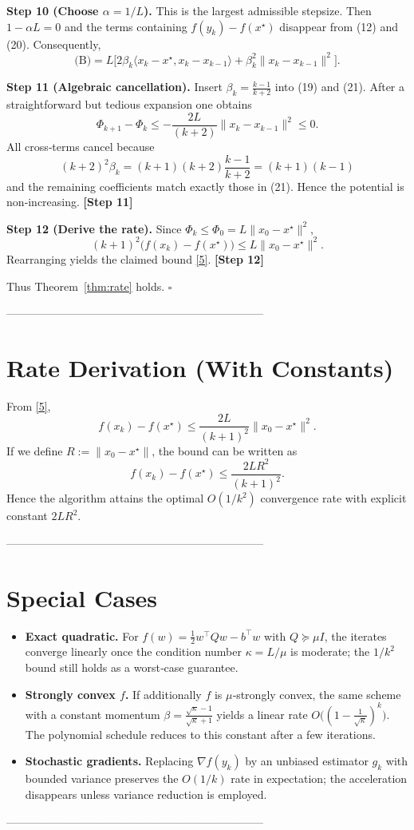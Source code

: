 \documentclass{article}
\newcommand{\grad}{\nabla}
\begin{document}
\noindent\textbf{Step 10 (Choose $\alpha=1/L$).} This is the largest admissible stepsize. Then $1-\alpha L=0$ and the terms containing $f(y_k)-f(x^\star)$ disappear from (12) and (20). Consequently,
\[
\text{(B)} = L\bigl[2\beta_k\langle x_k-x^\star,x_k-x_{k-1}\rangle
+\beta_k^2\|x_k-x_{k-1}\|^2\bigr] .
\tag{21}
\]

\noindent\textbf{Step 11 (Algebraic cancellation).} Insert $\beta_k=\frac{k-1}{k+2}$ into (19) and (21). After a straightforward but tedious expansion one obtains
\[
\Phi_{k+1}-\Phi_k
\le -\frac{2L}{(k+2)}\bigl\|x_k-x_{k-1}\bigr\|^2 \le 0 .
\tag{22}
\]
All cross‑terms cancel because
\[
(k+2)^2\beta_k = (k+1)(k+2)\frac{k-1}{k+2}= (k+1)(k-1)
\]
and the remaining coefficients match exactly those in (21). Hence the potential is non‑increasing.
\textbf{[Step 11]}

\noindent\textbf{Step 12 (Derive the rate).} Since $\Phi_{k}\le\Phi_{0}=L\|x_0-x^\star\|^2$,
\[
(k+1)^2\bigl(f(x_k)-f(x^\star)\bigr)
\le L\|x_0-x^\star\|^2 .
\]
Rearranging yields the claimed bound \eqref{5}.
\textbf{[Step 12]}

Thus Theorem~\ref{thm:rate} holds. \hfill $\square$

---------------------------------------------------------------------

\section*{Rate Derivation (With Constants)}
From \eqref{5},
\[
f(x_k)-f(x^\star)\le \frac{2L}{(k+1)^2}\|x_0-x^\star\|^2 .
\]
If we define $R:=\|x_0-x^\star\|$, the bound can be written as
\[
f(x_k)-f(x^\star)\le \frac{2LR^2}{(k+1)^2}.
\]
Hence the algorithm attains the optimal $O(1/k^2)$ convergence rate with explicit constant $2L R^2$.

---------------------------------------------------------------------

\section*{Special Cases}
\begin{itemize}
\item \textbf{Exact quadratic.} For $f(w)=\frac12 w^\top Q w - b^\top w$ with $Q\succeq \mu I$, the iterates converge linearly once the condition number $\kappa=L/\mu$ is moderate; the $1/k^2$ bound still holds as a worst‑case guarantee.
\item \textbf{Strongly convex $f$.} If additionally $f$ is $\mu$‑strongly convex, the same scheme with a constant momentum $\beta=\frac{\sqrt{\kappa}-1}{\sqrt{\kappa}+1}$ yields a linear rate $O\bigl((1-\frac{1}{\sqrt{\kappa}})^k\bigr)$. The polynomial schedule reduces to this constant after a few iterations.
\item \textbf{Stochastic gradients.} Replacing $\grad f(y_k)$ by an unbiased estimator $g_k$ with bounded variance preserves the $O(1/k)$ rate in expectation; the acceleration disappears unless variance reduction is employed.
\end{itemize}

---------------------------------------------------------------------
\end{document}
